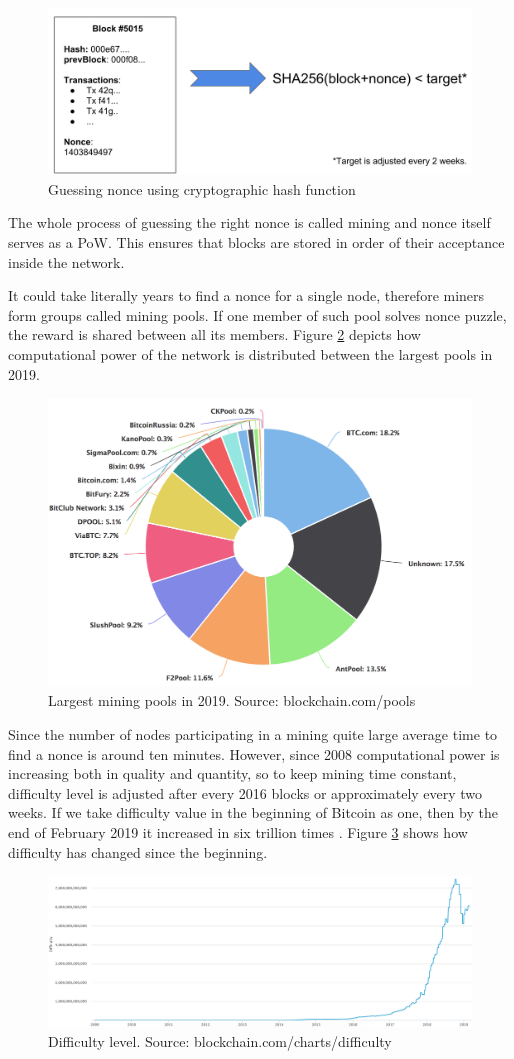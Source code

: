 \documentclass[conference,compsoc]{IEEEtran}
\begin{document}
\begin{figure}[h]
  \centering
  \includegraphics[width=.45\textwidth]{graphics/sha.png}
  \caption{Guessing nonce using cryptographic hash function}
  \label{fig:sha}
\end{figure}

The whole process of guessing the right nonce is called mining and nonce itself serves as a PoW. 
This ensures that blocks are stored in order of their acceptance inside the network.

It could take literally years to find a nonce for a single node, therefore miners form groups called mining pools.
If one member of such pool solves nonce puzzle, the reward is shared between all its members. 
Figure \ref{fig:pools} depicts how computational power of the network is distributed between the largest pools in 2019.

\begin{figure}[h]
  \centering
  \includegraphics[width=.45\textwidth]{graphics/pools.png}
  \caption[Caption]{Largest mining pools in 2019. Source: blockchain.com/pools}
  \label{fig:pools}
\end{figure}


Since the number of nodes participating in a mining quite large average time to find a nonce is around ten minutes. 
However, since 2008 computational power is increasing both in quality and quantity, so to keep mining time constant, difficulty level is adjusted after every 2016 blocks or approximately every two weeks. 
If we take difficulty value in the beginning of Bitcoin as one, then by the end of February 2019 it increased in six trillion times \cite{blockchain}.
Figure \ref{fig:fig3} shows how difficulty has changed since the beginning.

\begin{figure}[h]
  \centering
  \includegraphics[width=.45\textwidth]{graphics/target.png}
  \caption[Caption]{Difficulty level. Source: blockchain.com/charts/difficulty}
  \label{fig:fig3}
\end{figure}
\end{document}
